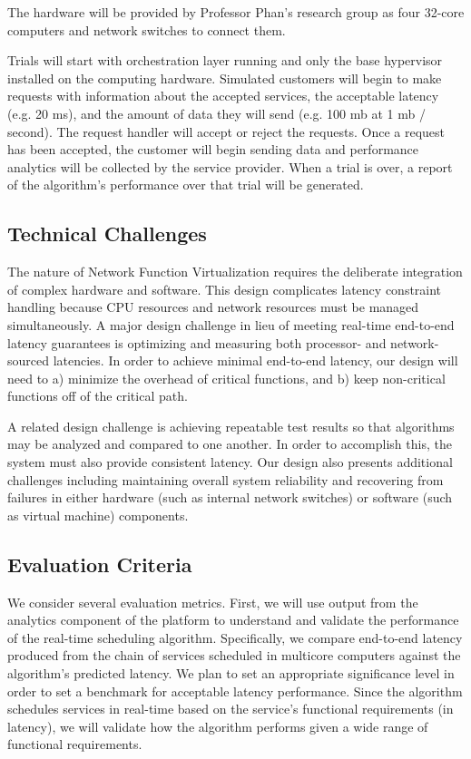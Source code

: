 \documentclass{sig-alternate}
\begin{document}
The hardware will be provided by Professor Phan's research group as four 32-core computers and network switches to connect them.

Trials will start with orchestration layer running and only the base hypervisor installed on the computing hardware. Simulated customers will begin to make requests with information about the accepted services, the acceptable latency (e.g. 20 ms), and the amount of data they will send (e.g. 100 mb at 1 mb / second). The request handler will accept or reject the requests. Once a request has been accepted, the customer will begin sending data and performance analytics will be collected by the service provider. When a trial is over, a report of the algorithm's performance over that trial will be generated.

\subsection{Technical Challenges}
\label{subsec:tech_challenges}

The nature of Network Function Virtualization requires the deliberate integration of complex hardware and software. This design complicates latency constraint handling because CPU resources and network resources must be managed simultaneously. A major design challenge in lieu of meeting real-time end-to-end latency guarantees is optimizing and measuring both processor- and network-sourced latencies. In order to achieve minimal end-to-end latency, our design will need to a) minimize the overhead of critical functions, and b) keep non-critical functions off of the critical path.

A related design challenge is achieving repeatable test results so that algorithms may be analyzed and compared to one another. In order to accomplish this, the system must also provide consistent latency. Our design also presents additional challenges including maintaining overall system reliability and recovering from failures in either hardware (such as internal network switches) or software (such as virtual machine) components.

\subsection{Evaluation Criteria}
\label{subsec:eval_criteria}

We consider several evaluation metrics. First, we will use output from the analytics component of the platform to understand and validate the performance of the real-time scheduling algorithm. Specifically, we compare end-to-end latency produced from the chain of services scheduled in multicore computers against the algorithm's predicted latency. We plan to set an appropriate significance level in order to set a benchmark for acceptable latency performance. Since the algorithm schedules services in real-time based on the service's functional requirements (in latency), we will validate how the algorithm performs given a wide range of functional requirements.
\end{document}
